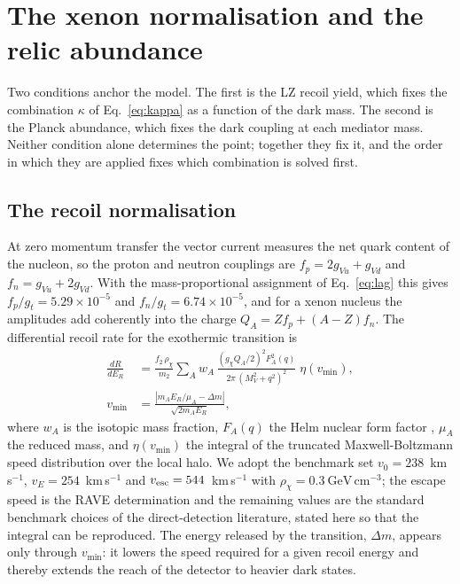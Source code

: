 \section{The xenon normalisation and the relic abundance}\label{sec:lz}

Two conditions anchor the model. The first is the LZ recoil yield, which fixes the combination $\kappa$ of Eq.~\eqref{eq:kappa} as a function of the dark mass. The second is the Planck abundance, which fixes the dark coupling at each mediator mass. Neither condition alone determines the point; together they fix it, and the order in which they are applied fixes which combination is solved first.

\subsection{The recoil normalisation}

At zero momentum transfer the vector current measures the net quark content of the nucleon, so the proton and neutron couplings are $f_p=2g_{Vu}+g_{Vd}$ and $f_n=g_{Vu}+2g_{Vd}$. With the mass-proportional assignment of Eq.~\eqref{eq:lag} this gives $f_p/g_t=5.29\times10^{-5}$ and $f_n/g_t=6.74\times10^{-5}$, and for a xenon nucleus the amplitudes add coherently into the charge $Q_A=Zf_p+(A-Z)f_n$. The differential recoil rate for the exothermic transition is
\begin{equation}
\begin{aligned}
\frac{dR}{dE_R}&=\frac{f_2\,\rho_\chi}{m_2}\sum_A w_A\,
\frac{(g_\chi Q_A/2)^2F_A^2(q)}{2\pi\,(M_V^2+q^2)^2}\;\eta(v_{\min}),\\
v_{\min}&=\frac{|m_AE_R/\mu_A-\Delta m|}{\sqrt{2m_AE_R}},
\end{aligned}
\label{eq:recoil}
\end{equation}
where $w_A$ is the isotopic mass fraction, $F_A(q)$ the Helm nuclear form factor \cite{HELM}, $\mu_A$ the reduced mass, and $\eta(v_{\min})$ the integral of the truncated Maxwell-Boltzmann speed distribution over the local halo. We adopt the benchmark set $v_0=238$~km\,s$^{-1}$, $v_E=254$~km\,s$^{-1}$ and $v_{\rm esc}=544$~km\,s$^{-1}$ with $\rho_\chi=0.3\ \mathrm{GeV\,cm^{-3}}$; the escape speed is the RAVE determination \cite{SHM} and the remaining values are the standard benchmark choices of the direct-detection literature, stated here so that the integral can be reproduced. The energy released by the transition, $\Delta m$, appears only through $v_{\min}$: it lowers the speed required for a given recoil energy and thereby extends the reach of the detector to heavier dark states.


